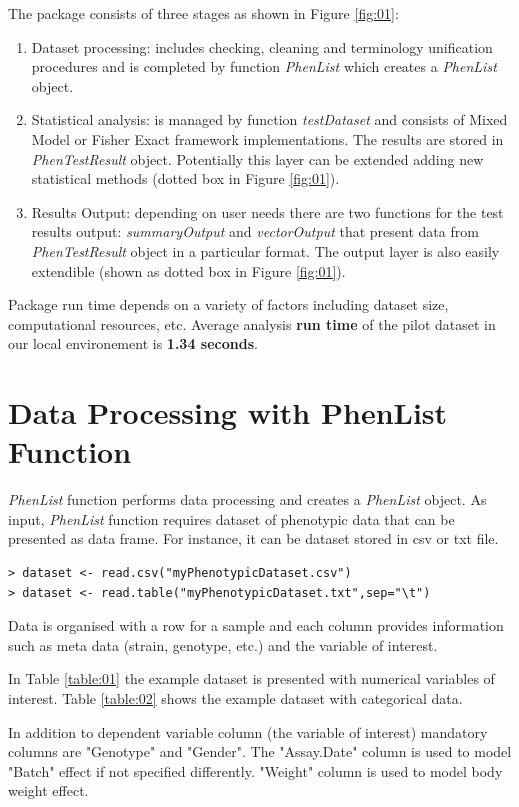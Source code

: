 \documentclass[12pt,a4paper]{article}
\begin{document}
The package consists of three stages as shown in Figure \ref{fig:01}:
\begin{enumerate}
\item Dataset processing: includes checking, cleaning and terminology unification procedures and is completed by function \textit{PhenList} which creates a \textit{PhenList} object. 
\item Statistical analysis: is managed by function \textit{testDataset} and consists of Mixed Model or Fisher Exact framework implementations. The results are stored in \textit{PhenTestResult} object. 
Potentially this layer can be extended adding new statistical methods (dotted box in Figure \ref{fig:01}). 
\item Results Output: depending on user needs there are two functions for the test results output: \textit{summaryOutput} 
and \textit{vectorOutput} that present data from \textit{PhenTestResult} object in a particular format. The output layer is also easily extendible (shown as dotted box in Figure \ref{fig:01}).
\end{enumerate}

Package run time depends on a variety of factors including dataset size, computational resources, etc. Average analysis \textbf{run time} of the pilot dataset in our local environement is \textbf{1.34 seconds}. 

\section{Data Processing with PhenList Function}
\textit{PhenList} function performs data processing and creates a \textit{PhenList} object. 
As input, \textit{PhenList} function requires dataset of phenotypic data that can be presented as data frame. For instance, it can be dataset stored in csv or txt file. 
\begingroup
    \fontsize{8pt}{12pt}\selectfont
\begin{verbatim}
> dataset <- read.csv("myPhenotypicDataset.csv")
> dataset <- read.table("myPhenotypicDataset.txt",sep="\t")
\end{verbatim}
\endgroup
Data is organised with a row for a sample and each column provides information such as meta data (strain, genotype, etc.) and the variable of interest.

In Table \ref{table:01} the example dataset is presented with numerical variables of interest. Table \ref{table:02} shows the example dataset with categorical data. 

In addition to dependent variable column (the variable of interest) mandatory columns are "Genotype" and "Gender". The "Assay.Date" column is used to model "Batch" effect if not specified differently. "Weight" column is used to model body weight effect.
\end{document}
